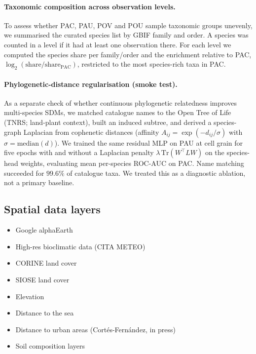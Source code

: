 \documentclass{article}
\begin{document}
\paragraph{Taxonomic composition across observation levels.}
To assess whether PAC, PAU, POV and POU sample taxonomic groups unevenly, we summarised the curated species list by GBIF family and order. A species was counted in a level if it had at least one observation there. For each level we computed the species share per family/order and the enrichment relative to PAC, $\log_2(\mathrm{share}/\mathrm{share}_{\mathrm{PAC}})$, restricted to the most species-rich taxa in PAC.

\paragraph{Phylogenetic-distance regularisation (smoke test).}
As a separate check of whether continuous phylogenetic relatedness improves multi-species SDMs, we matched catalogue names to the Open Tree of Life (TNRS; land-plant context), built an induced subtree, and derived a species-graph Laplacian from cophenetic distances (affinity $A_{ij}=\exp(-d_{ij}/\sigma)$ with $\sigma=\mathrm{median}(d)$). We trained the same residual MLP on PAU at cell grain for five epochs with and without a Laplacian penalty $\lambda\,\mathrm{Tr}(W^\top L W)$ on the species-head weights, evaluating mean per-species ROC-AUC on PAC. Name matching succeeded for $99.6\%$ of catalogue taxa. We treated this as a diagnostic ablation, not a primary baseline.

\subsection{Spatial data layers}



\begin{itemize}
    \item Google alphaEarth
    \item High-res bioclimatic data (CITA METEO)
    \item CORINE land cover
    \item SIOSE land cover
    \item Elevation
    \item Distance to the sea
    \item Distance to urban areas (Cortés-Fernández, in press)
    \item Soil composition layers
\end{itemize}
\end{document}
